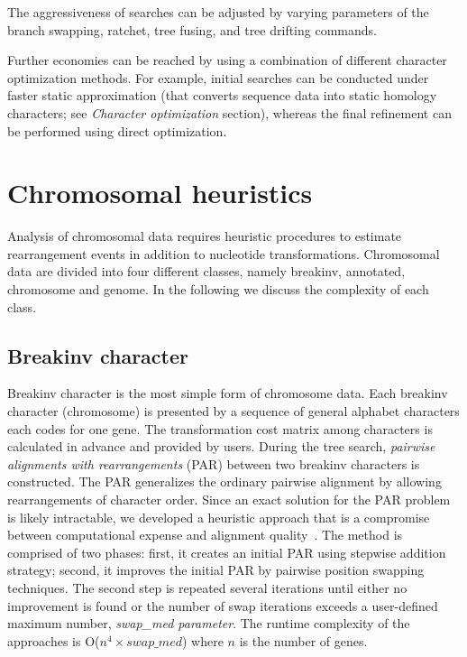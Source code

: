 The aggressiveness of searches can be adjusted by varying parameters of the branch swapping, ratchet, tree fusing, and tree drifting commands.

Further economies can be reached by using a combination of different character optimization methods. For example, initial searches can be conducted under faster static approximation (that converts sequence data into static homology characters; see \emph{Character optimization} section), whereas the final refinement can be performed using direct optimization.

\section{Chromosomal heuristics}
Analysis of chromosomal data requires heuristic procedures to estimate
rearrangement events in addition to nucleotide transformations. Chromosomal
data are divided into four different classes, namely breakinv, annotated, 
chromosome and genome. In the following we discuss the complexity of
each class.

\subsection{Breakinv character}
Breakinv character is the most simple form of chromosome data. Each breakinv
character (chromosome) is presented by a sequence of general alphabet characters each codes for
one gene. The transformation cost matrix among characters is calculated in advance
and provided by users. During the tree search, \emph{pairwise alignments with rearrangements} (PAR) 
between two breakinv characters is constructed.
The PAR generalizes the ordinary pairwise alignment by allowing rearrangements of character order. 
Since an exact solution for the PAR problem is likely intractable, we developed
a heuristic approach that is a compromise between computational expense and
alignment quality~\cite{vinh2006}. The method is comprised of two phases: first, it
creates an initial PAR using stepwise addition strategy; second, it improves the 
initial PAR by pairwise position swapping techniques. The second step is
repeated several iterations until either no improvement is found or the number
of swap iterations exceeds a user-defined maximum number,
\emph{swap\_med parameter}. 
The runtime complexity of the approaches is O($n^4 \times swap\_med$) where $n$ is 
the number of genes.

